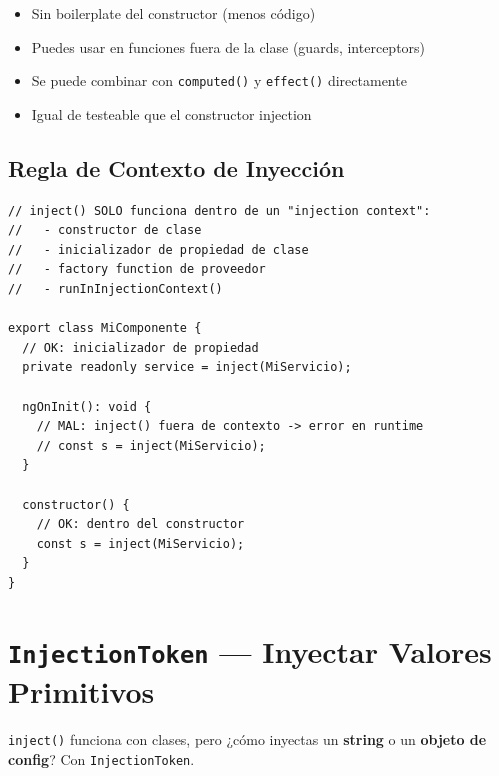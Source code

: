 \documentclass[12pt, a4paper]{article}
\begin{document}
\begin{tcolorbox}[regla, title={\emoji{pushpin} \emoji{star} Por qué \texttt{inject()} es Mejor}]
  \begin{itemize}
    \item {} Sin boilerplate del constructor (menos código)
    \item {} Puedes usar en funciones fuera de la clase (guards, interceptors)
    \item {} Se puede combinar con \texttt{computed()} y \texttt{effect()} directamente
    \item {} Igual de testeable que el constructor injection
  \end{itemize}
\end{tcolorbox}

\subsection{ Regla de Contexto de Inyección}

\begin{lstlisting}
// inject() SOLO funciona dentro de un "injection context":
//   - constructor de clase
//   - inicializador de propiedad de clase
//   - factory function de proveedor
//   - runInInjectionContext()

export class MiComponente {
  // OK: inicializador de propiedad
  private readonly service = inject(MiServicio);

  ngOnInit(): void {
    // MAL: inject() fuera de contexto -> error en runtime
    // const s = inject(MiServicio);
  }

  constructor() {
    // OK: dentro del constructor
    const s = inject(MiServicio);
  }
}
\end{lstlisting}

\section{  \texttt{InjectionToken} --- Inyectar Valores Primitivos}

\texttt{inject()} funciona con clases, pero ¿cómo inyectas un \textbf{string} o un \textbf{objeto de config}?
Con \texttt{InjectionToken}.
\end{document}
